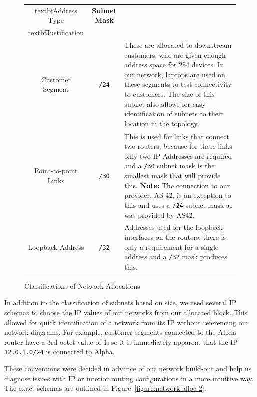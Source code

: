 \begin{figure}[!ht]     \caption{Classifications of Network Allocations}
\label{figure:network-alloc-1}     \centering
\begin{tabular}{|c|c|p{5.5cm}|}
		
		\hline textbf{Address Type} & \textbf{Subnet Mask} &
        \\textbf{Justification} \\
		
        \hline         Customer Segment & \texttt{/24} & These are allocated to
downstream customers, who are given enough address space for 254 devices. In
our network, laptops are used on these segments to test connectivity to
customers. The size of this subnet also allows for easy identification of
subnets to their location in the topology.\\
		
        \hline         Point-to-point Links & \texttt{/30} & This is used for
links that connect two routers, because for these links only two IP Addresses
are required and a \texttt{/30} subnet mask is the smallest mask that will
provide this. \textbf{Note:} The connection to our provider, AS 42, is an
exception to this and uses a \texttt{/24} subnet mask as was provided by
AS42.\\
		
        \hline         Loopback Address & \texttt{/32} & Addresses used for the
loopback interfaces on the routers, there is only a requirement for a single
address and a \texttt{/32} mask produces this.\\
		
        \hline     
    \end{tabular}
\end{figure} In addition to the classification
of subnets based on size, we used several IP schemas to choose the IP values of
our networks from our allocated block. This allowed for quick identification of
a network from its IP without referencing our network diagrams. For example,
customer segments connected to the Alpha router have a 3rd octet value of 1, so
it is immediately apparent that the IP \texttt{12.0.1.0/24} is connected to
Alpha.

These conventions were decided in advance of our network build-out and help us
diagnose issues with IP or interior routing configurations in a more intuitive
way. The exact schemas are outlined in Figure~\ref{figure:network-alloc-2}.

